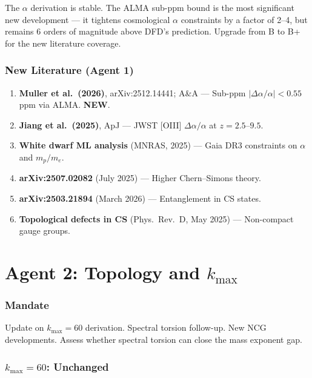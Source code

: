 \documentclass[11pt,a4paper]{article}
\newcommand{\NEW}{\textcolor{dfdblue}{\textbf{NEW}}}
\begin{document}
The $\alpha$ derivation is stable. The ALMA sub-ppm bound is the most significant new development --- it tightens cosmological $\alpha$ constraints by a factor of 2--4, but remains 6 orders of magnitude above DFD's prediction. Upgrade from B to B+ for the new literature coverage.

\section{New Literature (Agent 1)}

\begin{enumerate}
\item \textbf{Muller et al.\ (2026)}, arXiv:2512.14441; A\&A --- Sub-ppm $|\Delta\alpha/\alpha| < 0.55$ ppm via ALMA. \NEW.
\item \textbf{Jiang et al.\ (2025)}, ApJ --- JWST [OIII] $\Delta\alpha/\alpha$ at $z = 2.5$--$9.5$.
\item \textbf{White dwarf ML analysis} (MNRAS, 2025) --- Gaia DR3 constraints on $\alpha$ and $m_p/m_e$.
\item \textbf{arXiv:2507.02082} (July 2025) --- Higher Chern--Simons theory.
\item \textbf{arXiv:2503.21894} (March 2026) --- Entanglement in CS states.
\item \textbf{Topological defects in CS} (Phys.\ Rev.\ D, May 2025) --- Non-compact gauge groups.
\end{enumerate}


\part{Agent 2: Topology and $k_{\max}$}
\label{part:agent2}

\section{Mandate}

Update on $k_{\max} = 60$ derivation. Spectral torsion follow-up. New NCG developments. Assess whether spectral torsion can close the mass exponent gap.

\section{$k_{\max} = 60$: Unchanged}
\end{document}
